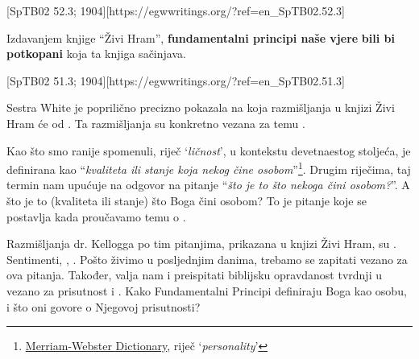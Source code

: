 [SpTB02 52.3; 1904][https://egwwritings.org/?ref=en\_SpTB02.52.3]

Izdavanjem knjige “Živi Hram”, \textbf{fundamentalni principi naše vjere} \textbf{bili bi potkopani}  koja ta knjiga sačinjava.

[SpTB02 51.3; 1904][https://egwwritings.org/?ref=en\_SpTB02.51.3]

Sestra White je poprilično precizno pokazala na koja razmišljanja u knjizi Živi Hram će  od . Ta razmišljanja su konkretno vezana za temu .

Kao što smo ranije spomenuli, riječ ‘\textit{ličnost}’, u kontekstu devetnaestog stoljeća, je definirana kao “\textit{kvaliteta ili stanje koja nekog čine osobom}”\footnote{\href{https://www.merriam-webster.com/dictionary/personality}{Merriam-Webster Dictionary}, riječ ‘\textit{personality}'}. Drugim riječima, taj termin nam upućuje na odgovor na pitanje “\textit{što je to što nekoga čini osobom?}”. A što je to (kvaliteta ili stanje) što Boga čini osobom? To je pitanje koje se postavlja kada proučavamo temu o .

Razmišljanja dr. Kellogga po tim pitanjima, prikazana u knjizi Živi Hram, su . Sentimenti, , . Pošto živimo u posljednjim danima, trebamo se zapitati vezano za ova pitanja. Također, valja nam i preispitati biblijsku opravdanost tvrdnji u  vezano za prisutnost i . Kako Fundamentalni Principi definiraju Boga kao osobu, i što oni govore o Njegovoj prisutnosti?

